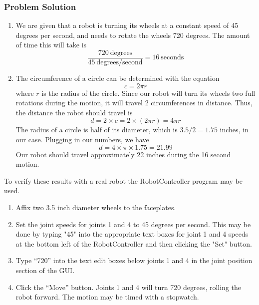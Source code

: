 \documentclass{article}
\begin{document}
\subsubsection{Problem Solution}
\begin{enumerate}
\item We are given that a robot is turning its wheels at a constant speed of 45 degrees per second, and 
needs to rotate the wheels 720 degrees. The amount of time this will take is
\begin{equation*}
\frac{720 ~\mathrm{degrees}}{45 ~\mathrm{degrees/second}} = 16 ~\mathrm{seconds}
\end{equation*}

\item The circumference of a circle can be determined with the equation
\begin{equation*}
c = 2 \pi r
\end{equation*} where $r$ is the radius of the circle. Since our robot will
turn its wheels two full rotations during the motion, it will travel 2 circumferences
in distance. Thus, the distance the robot should travel is
\begin{equation*}
d = 2 \times c = 2 \times (2 \pi r) = 4 \pi r
\end{equation*}
The radius of a circle is half of its diameter, which is $3.5 / 2 = 1.75$ inches, 
in our case. Plugging in our numbers, we have
\begin{equation*}
d = 4 \times \pi \times 1.75 = 21.99
\end{equation*}
Our robot should travel approximately 22 inches during the 16 second motion.
\end{enumerate}

To verify these results with a real robot the RobotController program may be used.
\begin{enumerate}
\item Affix two 3.5 inch diameter wheels to the faceplates.
\item Set the joint speeds for joints 1 and 4 to 45 degrees per second. This may
be done by typing "45" into the appropriate text boxes for joint 1 and 4 speeds at 
the bottom left of the RobotController and then clicking the "Set" button.
\item Type ``720'' into the text edit boxes below joints 1 and 4 in the joint
position section of the GUI.
\item Click the ``Move'' button. Joints 1 and 4 will turn 720 degrees, rolling
the robot forward. The motion may be timed with a stopwatch.
\end{enumerate}
\end{document}
